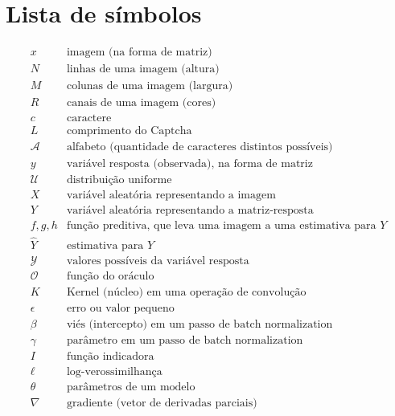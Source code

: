 \documentclass[12pt,twoside,brazilian]{book}
\begin{document}
\chapter*{Lista de símbolos}

\begin{displaymath}
\begin{array}{ll}
   x & \text{imagem (na forma de matriz)}\\
   N & \text{linhas de uma imagem (altura)}\\
   M & \text{colunas de uma imagem (largura)}\\
   R & \text{canais de uma imagem (cores)}\\
   c & \text{caractere}\\
   L & \text{comprimento do Captcha}\\
   \mathcal A & \text{alfabeto (quantidade de caracteres distintos possíveis)}\\
   y & \text{variável resposta (observada), na forma de matriz}\\
   \mathcal U & \text{distribuição uniforme}\\
   X & \text{variável aleatória representando a imagem}\\
   Y & \text{variável aleatória representando a matriz-resposta}\\
   f, g, h & \text{função preditiva, que leva uma imagem a uma estimativa para } Y\\
   \hat Y & \text{estimativa para } Y\\
   \mathcal Y & \text{valores possíveis da variável resposta}\\
   \mathcal O & \text{função do oráculo}\\
   K & \text{Kernel (núcleo) em uma operação de convolução}\\
   \epsilon & \text{erro ou valor pequeno}\\
   \beta & \text{viés (intercepto) em um passo de batch normalization}\\
   \gamma & \text{parâmetro em um passo de batch normalization}\\
   I & \text{função indicadora}\\
   \ell & \text{log-verossimilhança}\\
   \theta & \text{parâmetros de um modelo}\\
   \nabla & \text{gradiente (vetor de derivadas parciais)}\\

\end{array}
\end{displaymath}
\end{document}
